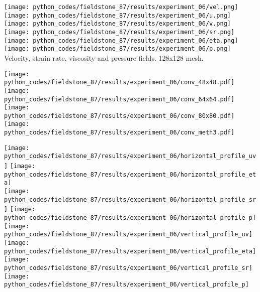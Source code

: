 \begin{center}
\texttt{[image: python\_codes/fieldstone\_87/results/experiment\_06/vel.png]}
\texttt{[image: python\_codes/fieldstone\_87/results/experiment\_06/u.png]}
\texttt{[image: python\_codes/fieldstone\_87/results/experiment\_06/v.png]}\\
\texttt{[image: python\_codes/fieldstone\_87/results/experiment\_06/sr.png]}
\texttt{[image: python\_codes/fieldstone\_87/results/experiment\_06/eta.png]}
\texttt{[image: python\_codes/fieldstone\_87/results/experiment\_06/p.png]}\\
{\captionfont Velocity, strain rate, viscosity and pressure fields. 128x128 mesh.}
\end{center}

\begin{center}
\texttt{[image: python\_codes/fieldstone\_87/results/experiment\_06/conv\_48x48.pdf]}
\texttt{[image: python\_codes/fieldstone\_87/results/experiment\_06/conv\_64x64.pdf]}\\
\texttt{[image: python\_codes/fieldstone\_87/results/experiment\_06/conv\_80x80.pdf]}
\texttt{[image: python\_codes/fieldstone\_87/results/experiment\_06/conv\_meth3.pdf]}
\end{center}

\begin{center}
\texttt{[image: python\_codes/fieldstone\_87/results/experiment\_06/horizontal\_profile\_uv]}
\texttt{[image: python\_codes/fieldstone\_87/results/experiment\_06/horizontal\_profile\_eta]}\\
\texttt{[image: python\_codes/fieldstone\_87/results/experiment\_06/horizontal\_profile\_sr]}
\texttt{[image: python\_codes/fieldstone\_87/results/experiment\_06/horizontal\_profile\_p]}\\
\texttt{[image: python\_codes/fieldstone\_87/results/experiment\_06/vertical\_profile\_uv]}
\texttt{[image: python\_codes/fieldstone\_87/results/experiment\_06/vertical\_profile\_eta]}\\
\texttt{[image: python\_codes/fieldstone\_87/results/experiment\_06/vertical\_profile\_sr]}
\texttt{[image: python\_codes/fieldstone\_87/results/experiment\_06/vertical\_profile\_p]}\\
\end{center}



\newpage
